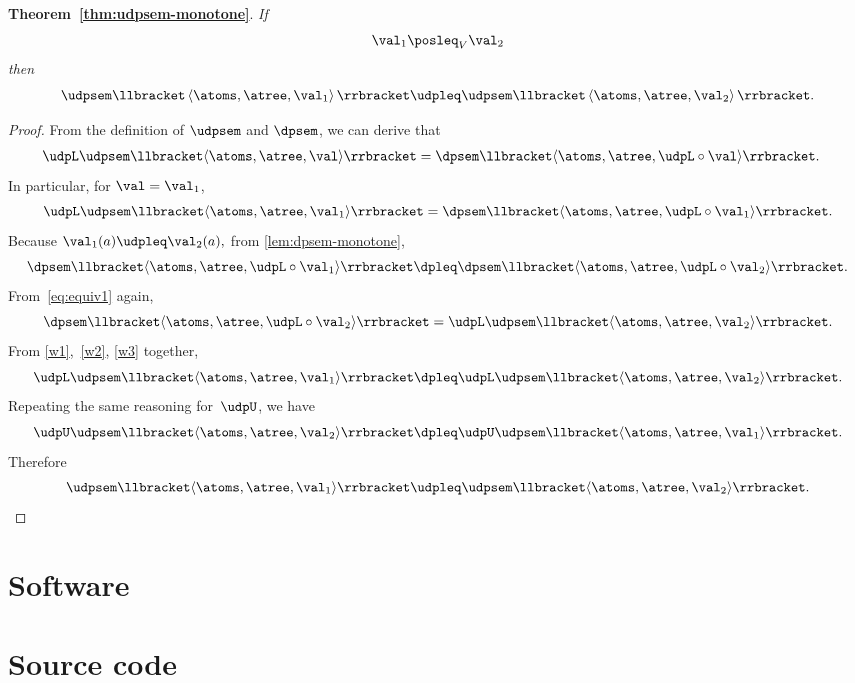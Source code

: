 \textbf{Theorem~\ref{thm:udpsem-monotone}}. \emph{If
\[
\val_{1}\posleq_{V}\val_{2}
\]
then
\[
\udpsem\llbracket\left\langle \atoms,\atree,\val_{1}\right\rangle \rrbracket\udpleq\udpsem\llbracket\left\langle \atoms,\atree,\val_{2}\right\rangle \rrbracket.
\]
}
\begin{proof}
From the definition of $\udpsem$ and $\dpsem$, we can derive that
\begin{align}
\udpL\udpsem\llbracket\langle\atoms,\atree,\val\rangle\rrbracket & =\dpsem\llbracket\langle\atoms,\atree,\udpL\circ\val\rangle\rrbracket.\label{eq:equiv1}
\end{align}
In particular, for $\val=\val_{1}$,
\begin{equation}
\udpL\udpsem\llbracket\langle\atoms,\atree,\val_{1}\rangle\rrbracket=\dpsem\llbracket\langle\atoms,\atree,\udpL\circ\val_{1}\rangle\rrbracket.\label{eq:w1}
\end{equation}
Because $\val_{1}(a)\udpleq\val_{2}(a),$ from \cref{lem:dpsem-monotone},
\begin{equation}
\dpsem\llbracket\langle\atoms,\atree,\udpL\circ\val_{1}\rangle\rrbracket\dpleq\dpsem\llbracket\langle\atoms,\atree,\udpL\circ\val_{2}\rangle\rrbracket.\label{eq:w2}
\end{equation}
From~\cref{eq:equiv1} again,
\begin{equation}
\dpsem\llbracket\langle\atoms,\atree,\udpL\circ\val_{2}\rangle\rrbracket=\udpL\udpsem\llbracket\langle\atoms,\atree,\val_{2}\rangle\rrbracket.\label{eq:w3}
\end{equation}
From \eqref{w1},~\eqref{w2}, \eqref{w3} together,
\[
\udpL\udpsem\llbracket\langle\atoms,\atree,\val_{1}\rangle\rrbracket\dpleq\udpL\udpsem\llbracket\langle\atoms,\atree,\val_{2}\rangle\rrbracket.
\]
 Repeating the same reasoning for~$\udpU$, we have
\[
\udpU\udpsem\llbracket\langle\atoms,\atree,\val_{2}\rangle\rrbracket\dpleq\udpU\udpsem\llbracket\langle\atoms,\atree,\val_{1}\rangle\rrbracket.
\]
 Therefore
\[
\udpsem\llbracket\langle\atoms,\atree,\val_{1}\rangle\rrbracket\udpleq\udpsem\llbracket\langle\atoms,\atree,\val_{2}\rangle\rrbracket.
\]
\end{proof}

\vfill\pagebreak

\section{Software}

\section{Source code}

